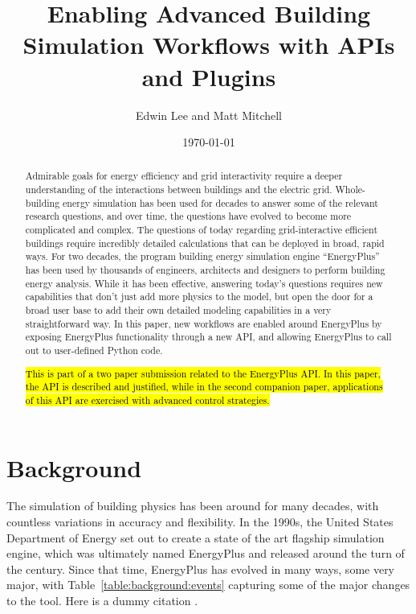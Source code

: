 \documentclass[5p]{elsarticle}
\title{Enabling Advanced Building Simulation Workflows with APIs and Plugins}
\author{Edwin Lee and Matt Mitchell}
\date{\today}
\begin{document}
  
 \begin{abstract}
Admirable goals for energy efficiency and grid interactivity require a deeper understanding of the interactions between buildings and the electric grid.  Whole-building energy simulation has been used for decades to answer some of the relevant research questions, and over time, the questions have evolved to become more complicated and complex.  The questions of today regarding grid-interactive efficient buildings require incredibly detailed calculations that can be deployed in broad, rapid ways. For two decades, the program building energy simulation engine “EnergyPlus” has been used by thousands of engineers, architects and designers to perform building energy analysis. While it has been effective, answering today’s questions requires new capabilities that don’t just add more physics to the model, but open the door for a broad user base to add their own detailed modeling capabilities in a very straightforward way.  In this paper, new workflows are enabled around EnergyPlus by exposing EnergyPlus functionality through a new API, and allowing EnergyPlus to call out to user-defined Python code.

\hl{This is part of a two paper submission related to the EnergyPlus API.  In this paper, the API is described and justified, while in the second companion paper, applications of this API are exercised with advanced control strategies.}
 \end{abstract}

 \maketitle
 
 \section{Background}

The simulation of building physics has been around for many decades, with countless variations in accuracy and flexibility.  In the 1990s, the United States Department of Energy set out to create a state of the art flagship simulation engine, which was ultimately named EnergyPlus and released around the turn of the century.  Since that time, EnergyPlus has evolved in many ways, some very major, with Table~\ref{table:background:events} capturing some of the major changes to the tool.  Here is a dummy citation \citep{Lee2013}.
\end{document}

